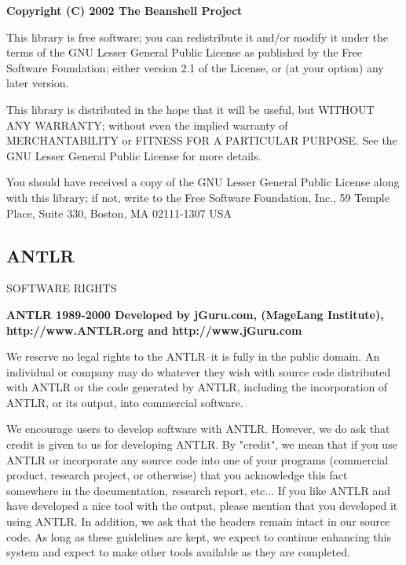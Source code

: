 \small

{\center \textbf{\textsf{Copyright (C) 2002 The Beanshell Project}}\\}

\bigskip

This library is free software; you can redistribute it and/or
modify it under the terms of the GNU Lesser General Public
License as published by the Free Software Foundation; either
version 2.1 of the License, or (at your option) any later version.

This library is distributed in the hope that it will be useful,
but WITHOUT ANY WARRANTY; without even the implied warranty of
MERCHANTABILITY or FITNESS FOR A PARTICULAR PURPOSE.  See the GNU
Lesser General Public License for more details.

You should have received a copy of the GNU Lesser General Public
License along with this library; if not, write to the Free Software
Foundation, Inc., 59 Temple Place, Suite 330, Boston, MA  02111-1307  USA

\normalsize

\subsection{ANTLR}

\small

SOFTWARE RIGHTS

{\center \textbf{\textsf{ANTLR 1989-2000 Developed by jGuru.com,
(MageLang Institute), \\ 
http://www.ANTLR.org  and http://www.jGuru.com}}\\}

\bigskip

We reserve no legal rights to the ANTLR--it is fully in the
public domain. An individual or company may do whatever
they wish with source code distributed with ANTLR or the
code generated by ANTLR, including the incorporation of
ANTLR, or its output, into commercial software.

We encourage users to develop software with ANTLR. However,
we do ask that credit is given to us for developing
ANTLR. By "credit", we mean that if you use ANTLR or
incorporate any source code into one of your programs
(commercial product, research project, or otherwise) that
you acknowledge this fact somewhere in the documentation,
research report, etc... If you like ANTLR and have
developed a nice tool with the output, please mention that
you developed it using ANTLR. In addition, we ask that the
headers remain intact in our source code. As long as these
guidelines are kept, we expect to continue enhancing this
system and expect to make other tools available as they are
completed.

\normalsize
